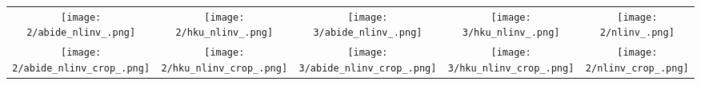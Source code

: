 \begin{tabular}{c @{\hskip 0pt} c @{\hskip 0pt} c @{\hskip 0pt} c @{\hskip 0pt}c }
    \texttt{[image: 2/abide\_nlinv\_.png]}&
    \texttt{[image: 2/hku\_nlinv\_.png]}&
    \texttt{[image: 3/abide\_nlinv\_.png]}&
    \texttt{[image: 3/hku\_nlinv\_.png]}&
    \texttt{[image: 2/nlinv\_.png]}\\
    \texttt{[image: 2/abide\_nlinv\_crop\_.png]}&
    \texttt{[image: 2/hku\_nlinv\_crop\_.png]}&
    \texttt{[image: 3/abide\_nlinv\_crop\_.png]}&
    \texttt{[image: 3/hku\_nlinv\_crop\_.png]}&
    \texttt{[image: 2/nlinv\_crop\_.png]}
\end{tabular}